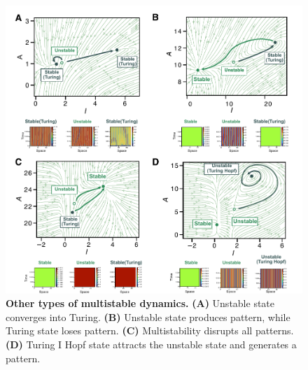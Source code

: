 \documentclass[10pt,letterpaper]{article}
\begin{document}
\begin{figure}[H]
    \includegraphics[width=1\textwidth]{figures/multistability_leftovers}
    \vspace{5pt}

    \caption{{\bf Other types of multistable dynamics.} \textbf{(A)} Unstable state converges into Turing. \textbf{(B)} Unstable state produces pattern, while Turing state loses pattern. \textbf{(C)} Multistability disrupts all patterns. \textbf{(D)} Turing I Hopf state attracts the unstable state and generates a pattern.}

    \label{sup_fig4}
\end{figure}
\end{document}
